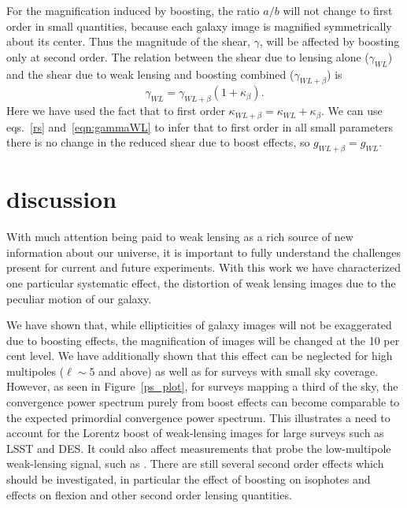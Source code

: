 \documentclass[useAMS,fleqn,usenatbib]{mn2e}
\begin{document}
For the  magnification induced by boosting, 
the ratio $a/b$ will not change to first order in small quantities, because each
galaxy image is magnified symmetrically about its center. Thus
the magnitude of the shear, $\gamma$, will be affected by boosting only at second order. The relation between the shear due to  lensing alone ($\gamma_{WL}$) and the shear
due to weak lensing and boosting combined ($\gamma_{WL+\beta}$) is
\begin{equation}
\label{eqn:gammaWL}
\gamma_{WL}=\gamma_{WL+\beta}\left(1+\kappa_{\beta}\right).
\end{equation}
Here we have used the fact that to first order $\kappa_{WL+\beta}=\kappa_{WL}+\kappa_{\beta}$.
We can use  eqs.~\ref{rs} and~\ref{eqn:gammaWL} to infer that to first order in all
small parameters there is no change in the reduced shear
due to boost effects, so $g_{WL+\beta}=g_{WL}$.



\section{discussion}
\label{discussion}

With much attention being paid to weak lensing as a rich source of new
information about our universe, it is important to fully understand the 
challenges present for current and future experiments. With this work we have
characterized one particular systematic effect, the distortion of weak
lensing images due to the peculiar motion of our galaxy.

We have shown that, while ellipticities of galaxy images will not be exaggerated
due to boosting effects, the magnification of images will be changed at the 10 per cent
level. We have additionally shown that this effect can be neglected for high 
multipoles ($\ell\sim 5$ and above) as well as for surveys with small sky coverage.
However, as seen in Figure~\ref{ps_plot}, for surveys mapping a third of the 
sky, the convergence power spectrum purely from boost effects can become comparable to the expected 
primordial convergence power spectrum. This illustrates a need to account for the Lorentz
boost of weak-lensing images for large surveys such as LSST and DES. It could also affect measurements that probe the low-multipole weak-lensing signal, such as \cite{Kesden:2003zm}.   There are 
still several second order effects which should be investigated, in
particular the effect of boosting on isophotes and effects on flexion and other second
order lensing quantities.  
\end{document}
